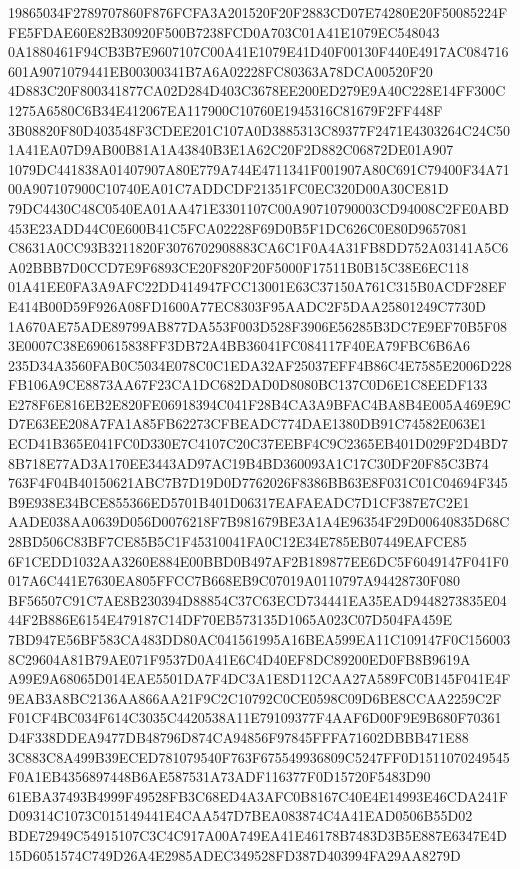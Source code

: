 \documentclass[UTF8,fontset=fandol,zihao=-4,a4paper]{ctexart}
\begin{document}
{{19865034F2789707860F876FCFA3A201520F20F2883CD07E74280E20F50085224FFE5FDAE60E82B30920F500B7238FCD0A703C01A41E1079EC548043
0A1880461F94CB3B7E9607107C00A41E1079E41D40F00130F440E4917AC084716601A9071079441EB00300341B7A6A02228FC80363A78DCA00520F20
4D883C20F800341877CA02D284D403C3678EE200ED279E9A40C228E14FF300C1275A6580C6B34E412067EA117900C10760E1945316C81679F2FF448F
3B08820F80D403548F3CDEE201C107A0D3885313C89377F2471E4303264C24C501A41EA07D9AB00B81A1A43840B3E1A62C20F2D882C06872DE01A907
1079DC441838A01407907A80E779A744E4711341F001907A80C691C79400F34A7100A907107900C10740EA01C7ADDCDF21351FC0EC320D00A30CE81D
79DC4430C48C0540EA01AA471E3301107C00A90710790003CD94008C2FE0ABD453E23ADD44C0E600B41C5FCA02228F69D0B5F1DC626C0E80D9657081
C8631A0CC93B3211820F3076702908883CA6C1F0A4A31FB8DD752A03141A5C6A02BBB7D0CCD7E9F6893CE20F820F20F5000F17511B0B15C38E6EC118
01A41EE0FA3A9AFC22DD414947FCC13001E63C37150A761C315B0ACDF28EFE414B00D59F926A08FD1600A77EC8303F95AADC2F5DAA25801249C7730D
1A670AE75ADE89799AB877DA553F003D528F3906E56285B3DC7E9EF70B5F083E0007C38E690615838FF3DB72A4BB36041FC084117F40EA79FBC6B6A6
235D34A3560FAB0C5034E078C0C1EDA32AF25037EFF4B86C4E7585E2006D228FB106A9CE8873AA67F23CA1DC682DAD0D8080BC137C0D6E1C8EEDF133
E278F6E816EB2E820FE06918394C041F28B4CA3A9BFAC4BA8B4E005A469E9CD7E63EE208A7FA1A85FB62273CFBEADC774DAE1380DB91C74582E063E1
ECD41B365E041FC0D330E7C4107C20C37EEBF4C9C2365EB401D029F2D4BD78B718E77AD3A170EE3443AD97AC19B4BD360093A1C17C30DF20F85C3B74
763F4F04B40150621ABC7B7D19D0D7762026F8386BB63E8F031C01C04694F345B9E938E34BCE855366ED5701B401D06317EAFAEADC7D1CF387E7C2E1
AADE038AA0639D056D0076218F7B981679BE3A1A4E96354F29D00640835D68C28BD506C83BF7CE85B5C1F45310041FA0C12E34E785EB07449EAFCE85
6F1CEDD1032AA3260E884E00BBD0B497AF2B189877EE6DC5F6049147F041F0017A6C441E7630EA805FFCC7B668EB9C07019A0110797A94428730F080
BF56507C91C7AE8B230394D88854C37C63ECD734441EA35EAD9448273835E0444F2B886E6154E479187C14DF70EB573135D1065A023C07D504FA459E
7BD947E56BF583CA483DD80AC041561995A16BEA599EA11C109147F0C1560038C29604A81B79AE071F9537D0A41E6C4D40EF8DC89200ED0FB8B9619A
A99E9A68065D014EAE5501DA7F4DC3A1E8D112CAA27A589FC0B145F041E4F9EAB3A8BC2136AA866AA21F9C2C10792C0CE0598C09D6BE8CCAA2259C2F
F01CF4BC034F614C3035C4420538A11E79109377F4AAF6D00F9E9B680F70361D4F338DDEA9477DB48796D874CA94856F97845FFFA71602DBBB471E88
3C883C8A499B39ECED781079540F763F675549936809C5247FF0D1511070249545F0A1EB4356897448B6AE587531A73ADF116377F0D15720F5483D90
61EBA37493B4999F49528FB3C68ED4A3AFC0B8167C40E4E14993E46CDA241FD09314C1073C015149441E4CAA547D7BEA083874C4A41EAD0506B55D02
BDE72949C54915107C3C4C917A00A749EA41E46178B7483D3B5E887E6347E4D15D6051574C749D26A4E2985ADEC349528FD387D403994FA29AA8279D
}}
\end{document}
